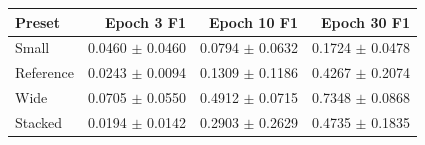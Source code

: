\begin{tabular}{lrrr}
\toprule
Preset & Epoch 3 F1 & Epoch 10 F1 & Epoch 30 F1 \\
\midrule
Small & 0.0460 $\pm$ 0.0460 & 0.0794 $\pm$ 0.0632 & 0.1724 $\pm$ 0.0478 \\
Reference & 0.0243 $\pm$ 0.0094 & 0.1309 $\pm$ 0.1186 & 0.4267 $\pm$ 0.2074 \\
Wide & 0.0705 $\pm$ 0.0550 & 0.4912 $\pm$ 0.0715 & 0.7348 $\pm$ 0.0868 \\
Stacked & 0.0194 $\pm$ 0.0142 & 0.2903 $\pm$ 0.2629 & 0.4735 $\pm$ 0.1835 \\
\bottomrule
\end{tabular}
